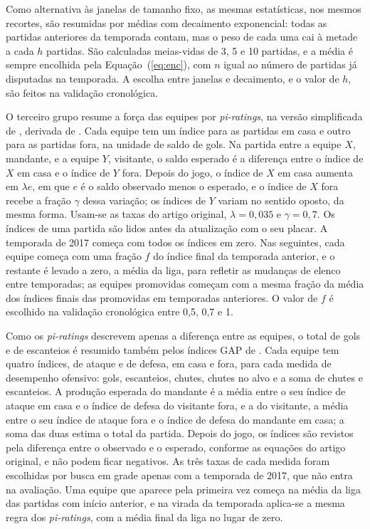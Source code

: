 Como alternativa às janelas de tamanho fixo, as mesmas estatísticas, nos mesmos recortes, são resumidas por médias com decaimento exponencial: todas as partidas anteriores da temporada contam, mas o peso de cada uma cai à metade a cada $h$ partidas. São calculadas meias-vidas de 3, 5 e 10 partidas, e a média é sempre encolhida pela Equação~(\ref{eq:enc}), com $n$ igual ao número de partidas já disputadas na temporada. A escolha entre janelas e decaimento, e o valor de $h$, são feitos na validação cronológica.

O terceiro grupo resume a força das equipes por \textit{pi-ratings}, na versão simplificada de , derivada de . Cada equipe tem um índice para as partidas em casa e outro para as partidas fora, na unidade de saldo de gols. Na partida entre a equipe $X$, mandante, e a equipe $Y$, visitante, o saldo esperado é a diferença entre o índice de $X$ em casa e o índice de $Y$ fora. Depois do jogo, o índice de $X$ em casa aumenta em $\lambda e$, em que $e$ é o saldo observado menos o esperado, e o índice de $X$ fora recebe a fração $\gamma$ dessa variação; os índices de $Y$ variam no sentido oposto, da mesma forma. Usam-se as taxas do artigo original, $\lambda = 0{,}035$ e $\gamma = 0{,}7$. Os índices de uma partida são lidos antes da atualização com o seu placar. A temporada de 2017 começa com todos os índices em zero. Nas seguintes, cada equipe começa com uma fração $f$ do índice final da temporada anterior, e o restante é levado a zero, a média da liga, para refletir as mudanças de elenco entre temporadas; as equipes promovidas começam com a mesma fração da média dos índices finais das promovidas em temporadas anteriores. O valor de $f$ é escolhido na validação cronológica entre 0,5, 0,7 e 1.

Como os \textit{pi-ratings} descrevem apenas a diferença entre as equipes, o total de gols e de escanteios é resumido também pelos índices GAP de . Cada equipe tem quatro índices, de ataque e de defesa, em casa e fora, para cada medida de desempenho ofensivo: gols, escanteios, chutes, chutes no alvo e a soma de chutes e escanteios. A produção esperada do mandante é a média entre o seu índice de ataque em casa e o índice de defesa do visitante fora, e a do visitante, a média entre o seu índice de ataque fora e o índice de defesa do mandante em casa; a soma das duas estima o total da partida. Depois do jogo, os índices são revistos pela diferença entre o observado e o esperado, conforme as equações do artigo original, e não podem ficar negativos. As três taxas de cada medida foram escolhidas por busca em grade apenas com a temporada de 2017, que não entra na avaliação. Uma equipe que aparece pela primeira vez começa na média da liga das partidas com início anterior, e na virada da temporada aplica-se a mesma regra dos \textit{pi-ratings}, com a média final da liga no lugar de zero.


